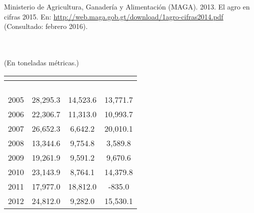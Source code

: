 	{\footnotesize	Ministerio de Agricultura, Ganadería y Alimentación (MAGA). 2013. El agro en cifras 2015. En: \url{http://web.maga.gob.gt/download/1agro-cifras2014.pdf}  (Consultado: febrero 2016).}
	
	
	
{\Bold\color{color1!80!black}{Cuadro \theCuadro $\,-$    Comercio exterior de ajonjolí (Sesamum indicum), por año}}\\
{\Bold\color{color1!80!black}{República de Guatemala,  2005 - 2014.}}\\
{(En toneladas métricas.)}\\[-1.5cm]
	
	\begin{center}
		\begin{tabular}{cS[table-format=8]S[table-format=8]S[table-format=8]}
			\\
			\hline &&&\\[-0.36cm]  
			 &	\\[0.05cm]
			& &	 &	 \\[0.05cm]
			\hline
			&	&&\\[-0.35cm]
				2005	&	28,295.3	&	14,523.6	&	13,771.7	\\[0.05cm]
			2006	&	22,306.7	&	11,313.0	&	10,993.7	\\[0.05cm]
				2007	&	26,652.3	&	6,642.2	&	20,010.1	\\[0.05cm]
			2008	&	13,344.6	&	9,754.8	&	3,589.8	\\[0.05cm]
				2009	&	19,261.9	&	9,591.2	&	9,670.6	\\[0.05cm]
			2010	&	23,143.9	&	8,764.1	&	14,379.8	\\[0.05cm]
				2011	&	17,977.0	&	18,812.0	&	-835.0	\\[0.05cm]
			2012	&	24,812.0	&	9,282.0	&	15,530.1	\\[0.05cm]

\end{tabular}
\end{center}
